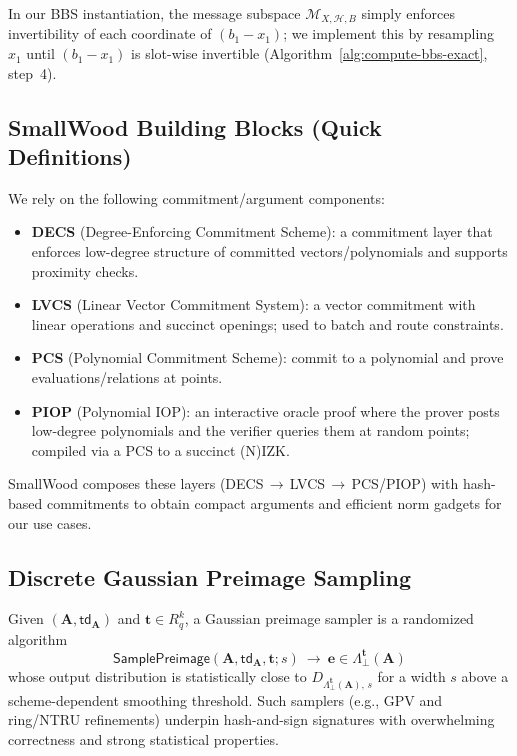 \noindent In our BBS instantiation, the message subspace $\mathcal{M}_{X,\mathcal{H},B}$ simply enforces invertibility of each coordinate of $(b_1-x_1)$; we implement this by resampling $x_1$ until $(b_1-x_1)$ is slot-wise invertible (Algorithm~\ref{alg:compute-bbs-exact}, step~4).

\subsection{SmallWood Building Blocks (Quick Definitions)}
\label{subsec:smallwood-defs}
We rely on the following commitment/argument components:
\begin{itemize}[leftmargin=1.25em]
  \item \textbf{DECS} (Degree-Enforcing Commitment Scheme): a commitment layer that enforces low-degree structure of committed vectors/polynomials and supports proximity checks.
  \item \textbf{LVCS} (Linear Vector Commitment System): a vector commitment with linear operations and succinct openings; used to batch and route constraints.
  \item \textbf{PCS} (Polynomial Commitment Scheme): commit to a polynomial and prove evaluations/relations at points.
  \item \textbf{PIOP} (Polynomial IOP): an interactive oracle proof where the prover posts low-degree polynomials and the verifier queries them at random points; compiled via a PCS to a succinct (N)IZK.
\end{itemize}
SmallWood composes these layers (DECS\,$\rightarrow$\,LVCS\,$\rightarrow$\,PCS/PIOP) with hash-based commitments to obtain compact arguments and efficient norm gadgets for our use cases.

\subsection{Discrete Gaussian Preimage Sampling}
\label{subsec:gaussian}
\begin{definition}\label{def:gaussian-sampler}
Given $(\mathbf{A},\mathsf{td}_\mathbf{A})$ and $\mathbf{t}\in R_q^{k}$, a Gaussian preimage sampler is a randomized algorithm
\[
  \mathsf{SamplePreimage}(\mathbf{A},\mathsf{td}_\mathbf{A},\mathbf{t};s)\ \longrightarrow\ \mathbf{e}\in \Lambda^{\mathbf{t}}_{\perp}(\mathbf{A})
\]
whose output distribution is statistically close to $D_{\Lambda^{\mathbf{t}}_{\perp}(\mathbf{A}),\,s}$ for a width $s$ above a scheme-dependent smoothing threshold. Such samplers (e.g., GPV and ring/NTRU refinements) underpin hash-and-sign signatures with overwhelming correctness and strong statistical properties.
\end{definition}

